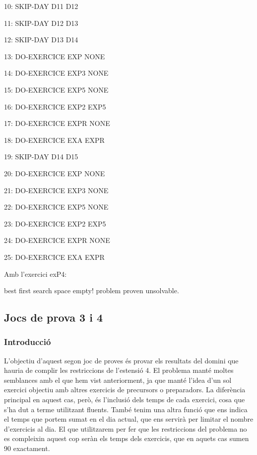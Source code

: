 \documentclass[a4paper,12pt, UTF-8]{article}
\begin{document}
    10: SKIP-DAY D11 D12
    
    11: SKIP-DAY D12 D13
    
    12: SKIP-DAY D13 D14
    
    13: DO-EXERCICE EXP NONE
    
    14: DO-EXERCICE EXP3 NONE
    
    15: DO-EXERCICE EXP5 NONE
    
    16: DO-EXERCICE EXP2 EXP5
    
    17: DO-EXERCICE EXPR NONE
    
    18: DO-EXERCICE EXA EXPR
    
    19: SKIP-DAY D14 D15
    
    20: DO-EXERCICE EXP NONE
    
    21: DO-EXERCICE EXP3 NONE
    
    22: DO-EXERCICE EXP5 NONE
    
    23: DO-EXERCICE EXP2 EXP5
    
    24: DO-EXERCICE EXPR NONE
    
    25: DO-EXERCICE EXA EXPR
    
 \setlength{\parskip}{0.7em}

	Amb l'exercici exP4:
	
	best first search space empty! problem proven unsolvable.
	
\subsection{Jocs de prova 3 i 4}
\subsubsection{Introducció}

L'objectiu d'aquest segon joc de proves és provar els resultats del domini que hauria de complir les restriccions de l'estensió 4. El problema manté moltes semblances amb el que hem vist anteriorment, ja que manté l'idea d'un sol exercici objectiu amb altres exercicis de precursors o preparadors. La diferència principal en aquest cas, però, és l'inclusió dels temps de cada exercici, cosa que s'ha dut a terme utilitzant fluents. També tenim una altra funció que ens indica el temps que portem sumat en el dia actual, que ens servirà per limitar el nombre d'exercicis al dia. El que utilitzarem per fer que les restriccions del problema no es compleixin aquest cop seràn els temps dels exercicis, que en aquets cas sumen 90 exactament.
\end{document}
